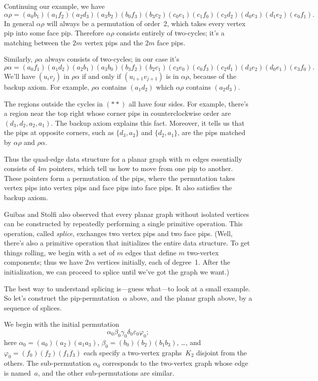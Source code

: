 Continuing our example, we have
$$\alpha\rho=
(a_0b_1)(a_1f_2)(a_2d_3)(a_3b_2)(b_0f_3)(b_3c_2)
(c_0e_1)(c_1f_0)(c_3d_2)(d_0e_3)(d_1e_2)(e_0f_1).$$
In general $\alpha\rho$ will always be
a permutation of order~2, which takes every vertex pip into some face pip.
Therefore $\alpha\rho$ consists entirely of two-cycles; it's a matching
between the $2m$ vertex pips and the $2m$ face pips.

Similarly, $\rho\alpha$ always consists of two-cycles; in our case it's
$$\rho\alpha=
(a_0f_1)(a_1d_2)(a_2b_1)(a_3b_0)(b_3f_2)(b_2c_1)
(c_3e_0)(c_0f_3)(c_2d_1)(d_3e_2)(d_0e_1)(e_3f_0).$$
We'll have $(u_iv_j)$ in $\rho\alpha$ if and only if $(u_{i+1}v_{j+1})$
is in $\alpha\rho$, because of the backup axiom. For example,
$\rho\alpha$ contains $(a_1d_2)$ which $\alpha\rho$ contains $(a_2d_3)$.

The regions outside the cycles in $(**)$ all have four sides. For example,
there's a region near the top right whose corner pips in counterclockwise
order are $(d_3,d_2,a_2,a_1)$. The backup axiom explains this fact.
Moreover, it tells us that the
pips at opposite corners, such as $\{d_3,a_2\}$ and $\{d_2,a_1\}$, are the
pips matched by $\alpha\rho$ and $\rho\alpha$.

\fi

Thus the quad-edge data structure for a planar graph with $m$ edges
essentially consists of $4m$ pointers, which tell us how to move
from one pip to another. These pointers form a permutation of the
pips, where the permutation takes vertex pips into vertex pips and
face pips into face pips. It also satisfies the backup axiom.

Guibas and Stolfi also observed that every planar graph without
isolated vertices can be constructed
by repeatedly performing a single primitive operation.
This operation, called {\it splice},
exchanges two vertex pips and two face pips. (Well, there's
also a primitive operation that initializes the entire data structure.
To get things rolling, we begin with
a set of $m$ edges that define $m$ two-vertex components;
thus we have $2m$ vertices initially, each of degree~1.
After the initialization, we can proceed to splice until we've got the
graph we want.)

The best way to understand splicing is---guess what---to look at
a small example. So let's construct the pip-permutation~$\alpha$
above, and the planar graph above, by a sequence of splices.

We begin with the initial permutation
$$\alpha_0\beta_0\gamma_0\delta_0\varepsilon_0\varphi_0;$$
here $\alpha_0=(a_0)(a_2)(a_1a_3)$,
$\beta_0=(b_0)(b_2)(b_1b_3)$, \dots, and
$\varphi_0=(f_0)(f_2)(f_1f_3)$
each specify a two-vertex graphs~$K_2$ disjoint from the others.
The sub-permutation $\alpha_0$ corresponds to the two-vertex
graph whose edge is named~$a$, and the other sub-permutations are similar.

